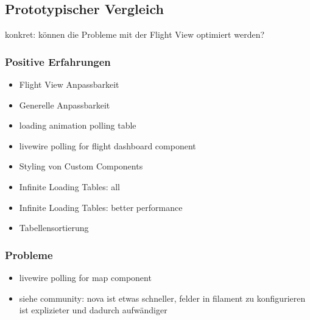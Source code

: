 \subsection{Prototypischer Vergleich}
konkret: können die Probleme mit der Flight View optimiert werden?

\subsubsection{Positive Erfahrungen}
\begin{itemize}
    \item Flight View Anpassbarkeit
    \item Generelle Anpassbarkeit
    \item loading animation polling table
    \item livewire polling for flight dashboard component
    \item Styling von Custom Components
    \item Infinite Loading Tables: all
    \item Infinite Loading Tables: better performance
    \item Tabellensortierung
\end{itemize}

\subsubsection{Probleme}
\begin{itemize}
    \item livewire polling for map component
    \item siehe community: nova ist etwas schneller, felder in filament zu konfigurieren ist explizieter und dadurch aufwändiger
\end{itemize}
